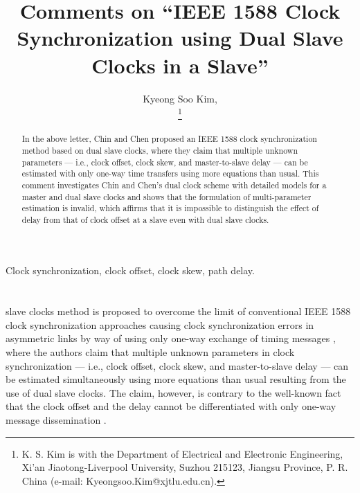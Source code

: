 \documentclass[journal,twoside,final]{IEEEtran}
\begin{document}
\title{\LARGE Comments on ``IEEE 1588 Clock Synchronization using Dual Slave
  Clocks in a Slave''}

\author{Kyeong Soo Kim, \\
  \thanks{K. S. Kim is with the Department of Electrical and Electronic
    Engineering, Xi'an Jiaotong-Liverpool University, Suzhou 215123, Jiangsu
    Province, P. R. China (e-mail: Kyeongsoo.Kim@xjtlu.edu.cn).}}

\maketitle


\begin{abstract}
  In the above letter, Chin and Chen proposed an IEEE 1588 clock synchronization
  method based on dual slave clocks, where they claim that multiple unknown
  parameters --- i.e., clock offset, clock skew, and master-to-slave delay ---
  can be estimated with only one-way time transfers using more equations than
  usual. This comment investigates Chin and Chen's dual clock scheme with
  detailed models for a master and dual slave clocks and shows that the
  formulation of multi-parameter estimation is invalid, which affirms that it is
  impossible to distinguish the effect of delay from that of clock offset at a
  slave even with dual slave clocks.
\end{abstract}

\begin{IEEEkeywords}
  Clock synchronization, clock offset, clock skew, path delay.
\end{IEEEkeywords}

\section*{}
\label{sec-1}
 slave clocks method is proposed to overcome the limit of
conventional IEEE 1588 clock synchronization approaches causing clock
synchronization errors in asymmetric links by way of using only one-way exchange
of timing messages \cite{chin09:_ieee}, where the authors claim that multiple
unknown parameters in clock synchronization --- i.e., clock offset, clock skew,
and master-to-slave delay --- can be estimated simultaneously using more
equations than usual resulting from the use of dual slave clocks. The claim,
however, is contrary to the well-known fact that the clock offset and the delay
cannot be differentiated with only one-way message dissemination
\cite{wu11:_clock_synch_wirel_sensor_networ}.
\end{document}
